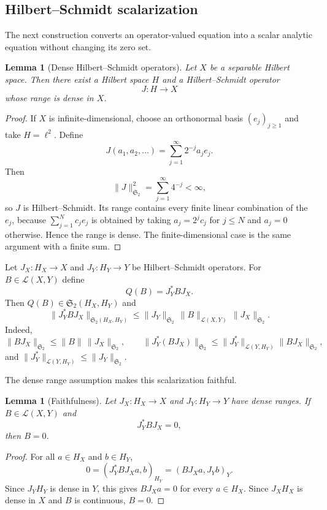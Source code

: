 \documentclass[12pt,oneside]{amsart}
\newtheorem{lemma}[theorem]{Lemma}
\newcommand{\cL}{\mathcal L}
\newcommand{\HS}{\mathfrak S_2}
\begin{document}
\subsection{Hilbert--Schmidt scalarization}

The next construction converts an operator-valued equation into a scalar analytic equation without changing its zero set.

\begin{lemma}[Dense Hilbert--Schmidt operators]\label{lem:HS-probes}
Let $X$ be a separable Hilbert space.  Then there exist a Hilbert space $H$ and a Hilbert--Schmidt operator
\[
        J:H\to X
\]
whose range is dense in $X$.
\end{lemma}

\begin{proof}
If $X$ is infinite-dimensional, choose an orthonormal basis $(e_j)_{j\ge1}$ and take $H=\ell^2$.  Define
\[
        J(a_1,a_2,\ldots)=\sum_{j=1}^{\infty}2^{-j}a_j e_j .
\]
Then
\[
        \|J\|_{\HS}^2=\sum_{j=1}^{\infty}4^{-j}<\infty,
\]
so $J$ is Hilbert--Schmidt.  Its range contains every finite linear combination of the $e_j$, because $\sum_{j=1}^N c_j e_j$ is obtained by taking $a_j=2^j c_j$ for $j\le N$ and $a_j=0$ otherwise.  Hence the range is dense.  The finite-dimensional case is the same argument with a finite sum.
\end{proof}

Let $J_X:H_X\to X$ and $J_Y:H_Y\to Y$ be Hilbert--Schmidt operators.  For $B\in\cL(X,Y)$ define
\[
        Q(B)=J_Y^*BJ_X .
\]
Then $Q(B)\in\HS(H_X,H_Y)$ and
\begin{equation}\label{eq:HS-bound}
        \|J_Y^*BJ_X\|_{\HS(H_X,H_Y)}
        \le \|J_Y\|_{\HS}\,\|B\|_{\cL(X,Y)}\,\|J_X\|_{\HS}.
\end{equation}
Indeed,
\[
        \|BJ_X\|_{\HS}\le \|B\|\,\|J_X\|_{\HS},
        \qquad
        \|J_Y^*(BJ_X)\|_{\HS}
        \le \|J_Y^*\|_{\cL(Y,H_Y)}\|BJ_X\|_{\HS},
\]
and $\|J_Y^*\|_{\cL(Y,H_Y)}\le \|J_Y\|_{\HS}$.

The dense range assumption makes this scalarization faithful.

\begin{lemma}[Faithfulness]\label{lem:faithful}
Let $J_X:H_X\to X$ and $J_Y:H_Y\to Y$ have dense ranges.  If $B\in\cL(X,Y)$ and
\[
        J_Y^*BJ_X=0,
\]
then $B=0$.
\end{lemma}

\begin{proof}
For all $a\in H_X$ and $b\in H_Y$,
\[
        0=(J_Y^*BJ_Xa,b)_{H_Y}=(BJ_Xa,J_Yb)_Y .
\]
Since $J_YH_Y$ is dense in $Y$, this gives $BJ_Xa=0$ for every $a\in H_X$.  Since $J_XH_X$ is dense in $X$ and $B$ is continuous, $B=0$.
\end{proof}
\end{document}
